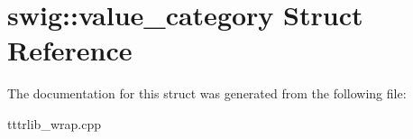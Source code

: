 \hypertarget{structswig_1_1value__category}{}\section{swig\+:\+:value\+\_\+category Struct Reference}
\label{structswig_1_1value__category}


The documentation for this struct was generated from the following file\+:\begin{DoxyCompactItemize}
\item 
tttrlib\+\_\+wrap.\+cpp\end{DoxyCompactItemize}
